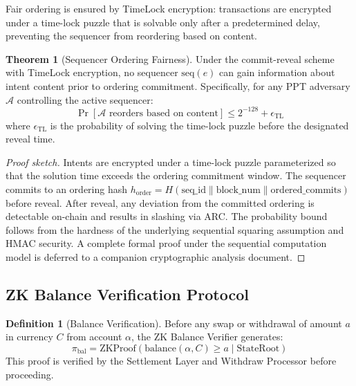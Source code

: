 \documentclass[12pt,a4paper]{article}
\theoremstyle{definition}
\newtheorem{definition}{Definition}[section]
\newtheorem{theorem}{Theorem}[section]
\theoremstyle{remark}
\begin{document}
Fair ordering is ensured by TimeLock encryption: transactions are encrypted under a time-lock puzzle that is solvable only after a predetermined delay, preventing the sequencer from reordering based on content.

\begin{theorem}[Sequencer Ordering Fairness]
\label{thm:sequencer-fairness}
Under the commit-reveal scheme with TimeLock encryption, no sequencer $\text{seq}(e)$ can gain information about intent content prior to ordering commitment. Specifically, for any PPT adversary $\mathcal{A}$ controlling the active sequencer:
\begin{equation}
\Pr[\mathcal{A}\text{ reorders based on content}] \leq 2^{-128} + \epsilon_{\text{TL}}
\end{equation}
where $\epsilon_{\text{TL}}$ is the probability of solving the time-lock puzzle before the designated reveal time.
\end{theorem}

\begin{proof}[Proof sketch]
Intents are encrypted under a time-lock puzzle parameterized so that the solution time exceeds the ordering commitment window. The sequencer commits to an ordering hash $h_{\text{order}} = H(\text{seq\_id} \| \text{block\_num} \| \text{ordered\_commits})$ before reveal. After reveal, any deviation from the committed ordering is detectable on-chain and results in slashing via ARC. The probability bound follows from the hardness of the underlying sequential squaring assumption and HMAC security. A complete formal proof under the sequential computation model is deferred to a companion cryptographic analysis document.
\end{proof}

\subsection{ZK Balance Verification Protocol}

\begin{definition}[Balance Verification]
Before any swap or withdrawal of amount $a$ in currency $C$ from account $\alpha$, the ZK Balance Verifier generates:
\begin{equation}
\pi_{\text{bal}} = \text{ZKProof}(\text{balance}(\alpha, C) \geq a \mid \text{StateRoot})
\end{equation}
This proof is verified by the Settlement Layer and Withdraw Processor before proceeding.
\end{definition}
\end{document}
